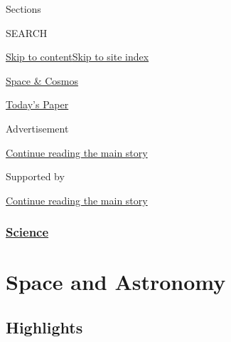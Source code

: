 Sections

SEARCH

\protect\hyperlink{site-content}{Skip to
content}\protect\hyperlink{site-index}{Skip to site index}

\href{https://www.nytimes.com/section/science/space}{Space \& Cosmos}

\href{https://myaccount.nytimes.com/auth/login?response_type=cookie\&client_id=vi}{}

\href{https://www.nytimes.com/section/todayspaper}{Today's Paper}

Advertisement

\protect\hyperlink{after-top}{Continue reading the main story}

Supported by

\protect\hyperlink{after-sponsor}{Continue reading the main story}

\hypertarget{science}{%
\subsubsection{\texorpdfstring{\href{/section/science}{Science}}{Science}}\label{science}}

\hypertarget{space-and-astronomy}{%
\section{Space and Astronomy}\label{space-and-astronomy}}

\hypertarget{highlights}{%
\subsection{Highlights}\label{highlights}}

